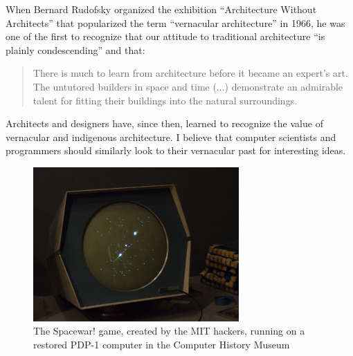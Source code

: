 When Bernard Rudofsky organized the exhibition ``Architecture Without Architects'' that popularized
the term ``vernacular architecture'' in 1966, he was one of the first to recognize that our
attitude to traditional architecture ``is plainly condescending'' and that:

\begin{quote}
There is much to learn from architecture before it became an expert's art. The
untutored builders in space and time (...) demonstrate an admirable talent for
fitting their buildings into the natural surroundings.
\end{quote}

Architects and designers have, since then, learned to recognize the value of vernacular and
indigenous architecture. I believe that computer scientists and
programmers should similarly look to their vernacular past for interesting ideas.

\begin{figure}
  \centering
  \includegraphics[width=0.7\textwidth]{fig/spacewar.jpg}
  \caption{The Spacewar! game, created by the MIT hackers, running on a restored PDP-1 computer
  in the Computer History Museum}
  \label{fig:spacewar}
\end{figure}

